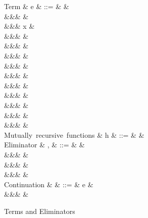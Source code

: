 \begin{figure}[H]
\begin{syntaxfig}
\mbox{Term}
&
e
&
::=
&
\exTrue \mid \exFalse
&
\\
&&&
&
\\
&&&
x
&
\\
&&&
&
\\
&&&
\exNil
&
\\
&&&
&
\\
&&&
&
\\
&&&
&
\\
&&&
&
\\
&&&
&
\\
&&&
&
\\
&&&
\exLambda{\sigma}
&
\\
&&&
&
\\[2mm]
\mbox{Mutually recursive functions}
&
h
&
::=
&
&
\\[2mm]
\mbox{Eliminator}
&
\sigma, \tau
&
::=
&
&
\\
&&&
&
\\
&&&
&
\\
&&&
\elimList{\kappa}{\sigma}
&
\\[2mm]
\mbox{Continuation}
&
\kappa
&
::=
&
e
&
\\
&&&
\sigma
&
\end{syntaxfig}
\caption{Terms and Eliminators}
\label{fig:core-syntax-term}
\end{figure}

